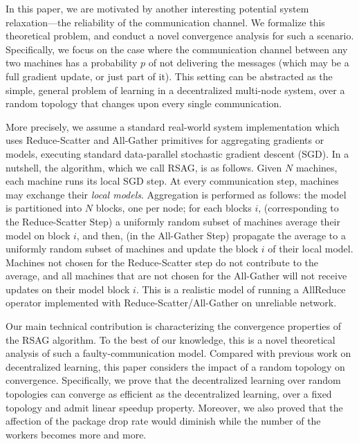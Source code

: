 \documentclass{article}
\newcounter{ass_counter}
\newcounter{thm_counter}
\begin{document}
In this paper, we are motivated by another interesting potential system relaxation---the reliability of the communication channel. We formalize this theoretical problem,   and conduct a novel
convergence analysis for such a scenario. Specifically, we focus on the case where the communication channel between any two machines has a probability $p$ of not delivering the messages (which may be a full gradient update, or just part of it). 
This setting can be abstracted as the simple, general problem of learning in a decentralized multi-node system, over a random topology that changes upon every single communication.

More precisely, we assume a standard real-world system
implementation which uses Reduce-Scatter and All-Gather primitives for aggregating gradients or models, executing standard data-parallel stochastic gradient descent (SGD). 
In a nutshell, the algorithm, which we call RSAG, is as follows. Given
$N$ machines, each machine runs its local SGD step.
At every communication step, machines may exchange their {\em local models}. 
Aggregation is performed as follows: the model is partitioned into $N$ blocks, one per node; for each blocks $i$, (corresponding to the Reduce-Scatter Step) a uniformly random 
subset of machines average their
model on block $i$, and then, (in the All-Gather Step) propagate the average to a uniformly 
random subset of machines and update the block $i$ of their local model.
Machines not chosen for the Reduce-Scatter step
do not contribute to the average, and all machines that are not chosen  for the All-Gather will not receive updates on their model block $i$.
This is a realistic model of running a AllReduce operator implemented
with Reduce-Scatter/All-Gather on unreliable network.

Our main technical contribution is characterizing the convergence properties of the RSAG algorithm. To the best of our knowledge, this is a novel
theoretical analysis of such a faulty-communication model. Compared with previous work on
decentralized learning, this paper considers the impact
of a random topology on convergence. Specifically, we prove that the decentralized learning over random topologies can converge as efficient as the decentralized learning, over a fixed topology and admit linear speedup property. Moreover, we also proved that the affection of the package drop rate would diminish while the number of the workers becomes more and more.
\end{document}
